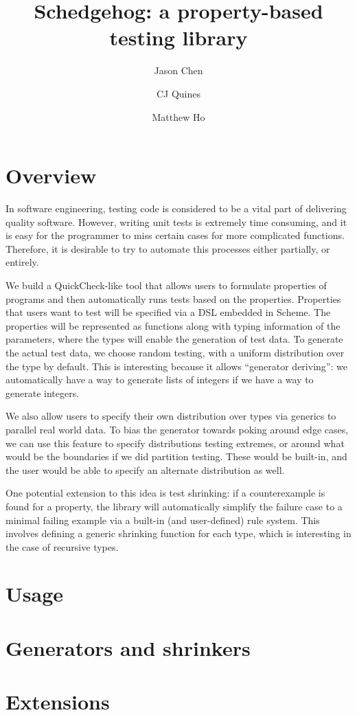 \documentclass{scrartcl}
\title{Schedgehog: a property-based testing library}
\author{Jason Chen \and CJ Quines \and Matthew Ho}
\begin{document}
\maketitle


\section{Overview}

In software engineering, testing code is considered to
be a vital part of delivering quality software.
However, writing unit tests is extremely time consuming,
and it is easy for the programmer to miss certain cases
for more complicated functions.
Therefore, it is desirable to try to automate this processes
either partially, or entirely.

We build a QuickCheck-like tool that allows users to
formulate properties of programs and then
automatically runs tests based on the properties.
Properties that users want to test will be specified
via a DSL embedded in Scheme.
The properties will be represented as functions
along with typing information of the parameters,
where the types will enable the generation of test data.
To generate the actual test data, we choose random testing,
with a uniform distribution over the type by default.
This is interesting because it allows ``generator deriving'':
we automatically have a way to generate lists of integers
if we have a way to generate integers.

We also allow users to specify their own distribution
over types via generics to parallel real world data.
To bias the generator towards poking around edge cases,
we can use this feature to specify distributions testing extremes,
or around what would be the boundaries if we did partition testing.
These would be built-in, and the user would be able to
specify an alternate distribution as well.

One potential extension to this idea is test shrinking:
if a counterexample is found for a property,
the library will automatically simplify
the failure case to a minimal failing example
via a built-in (and user-defined) rule system.
This involves defining a generic shrinking function for each type,
which is interesting in the case of recursive types.

\section{Usage}


\section{Generators and shrinkers}


\section{Extensions}
\end{document}
